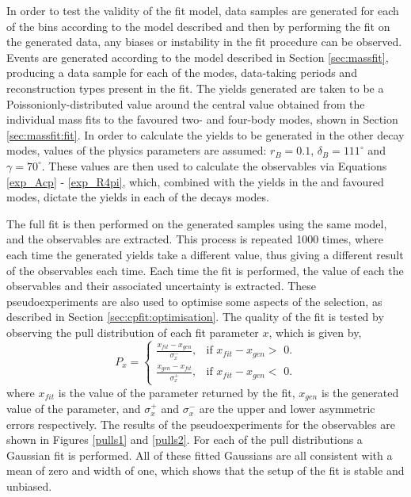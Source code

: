 In order to test the validity of the \CP fit model, data samples are generated for each of the bins according to the model described and then by performing the \CP fit on the generated data, any biases or instability in the \CP fit procedure can be observed. Events are generated according to the model described in Section \ref{sec:massfit}, producing a data sample for each of the \Dz modes, data-taking periods and \KS reconstruction types present in the \CP fit. The yields generated are taken to be a Poissonionly-distributed value around the central value obtained from the individual mass fits to the favoured two- and four-body modes, shown in Section \ref{sec:massfit:fit}. In order to calculate the yields to be generated in the other \Dz decay modes, values of the physics parameters are assumed: $r_B = 0.1$, $\delta_B = 111^{\circ}$ and $\gamma = 70^{\circ}$. These values are then used to calculate the \CP observables via Equations \ref{exp_Acp} - \ref{exp_R4pi}, which, combined with the yields in the \kpi and \kpipipi favoured modes, dictate the yields in each of the \Dz decays modes. 

The full \CP fit is then performed on the generated samples using the same model, and the \CP observables are extracted. This process is repeated 1000 times, where each time the generated yields take a different value, thus giving a different result of the \CP observables each time. Each time the fit is performed, the value of each the \CP observables and their associated uncertainty is extracted. These pseudoexperiments are also used to optimise some aspects of the selection, as described in Section \ref{sec:cpfit:optimisation}. The quality of the fit is tested by observing the pull distribution of each fit parameter $x$, which is given by,
\begin{equation*}
P_x = \begin{cases}
	\frac{x_{fit} - x_{gen}}{\sigma_x^-}, & \text{if $x_{fit} - x_{gen} >$ 0}. \\
	\frac{x_{gen} - x_{fit}}{\sigma_x^+}, & \text{if $x_{fit} - x_{gen} <$ 0}.
	\end{cases}
\end{equation*}
where $x_{fit}$ is the value of the parameter returned by the fit, $x_{gen}$ is the generated value of the parameter, and $\sigma_x^+$ and $\sigma_x^-$ are the upper and lower asymmetric errors respectively. The results of the pseudoexperiments for the \CP observables are shown in Figures \ref{pulls1} and \ref{pulls2}. For each of the pull distributions a Gaussian fit is performed. All of these fitted Gaussians are all consistent with a mean of zero and width of one, which shows that the setup of the \CP fit is stable and unbiased. 
 

